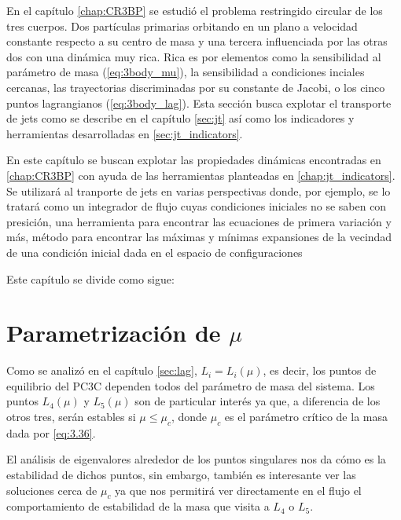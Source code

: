 En el capítulo \ref{chap:CR3BP} se estudió el problema restringido circular de los tres cuerpos. Dos partículas primarias orbitando en un plano a velocidad constante respecto a su centro de masa y una tercera influenciada por las otras dos con una dinámica muy rica. Rica es por elementos como la sensibilidad al parámetro de masa (\ref{eq:3body_mu}), la sensibilidad a condiciones inciales cercanas, las trayectorias discriminadas por su constante de Jacobi, o los cinco puntos lagrangianos (\ref{eq:3body_lag}). Esta sección busca explotar el transporte de jets como se describe en el capítulo \ref{sec:jt} así como los indicadores y herramientas desarrolladas en \ref{sec:jt_indicators}. 

En este capítulo se buscan explotar las propiedades dinámicas encontradas en \ref{chap:CR3BP} con ayuda de las herramientas planteadas en \ref{chap:jt_indicators}. Se utilizará al tranporte de jets en varias perspectivas donde, por ejemplo, se lo tratará como un integrador de flujo cuyas condiciones iniciales no se saben con presición, una herramienta para encontrar las ecuaciones de primera variación y más, método para encontrar las máximas y mínimas expansiones de la vecindad de una condición inicial dada en el espacio de configuraciones

Este capítulo se divide como sigue: 


\section{Parametrización de $\mu$}
Como se analizó en el capítulo \ref{sec:lag}, $L_i = L_i(\mu)$, es decir, los puntos de equilibrio del PC3C dependen todos del parámetro de masa del sistema. Los puntos $L_4(\mu)$ y $L_5(\mu)$ son de particular interés ya que, a diferencia de los otros tres, serán estables si $\mu \leq \mu_c$, donde $\mu_c$ es el parámetro crítico de la masa dada por \ref{eq:3.36}. 

El análisis de eigenvalores alrededor de los puntos singulares nos da cómo es la estabilidad de dichos puntos, sin embargo, también es interesante ver las soluciones cerca de $\mu_c$ ya que nos permitirá ver directamente en el flujo el comportamiento de estabilidad de la masa que visita a $L_4$ o $L_5$.

